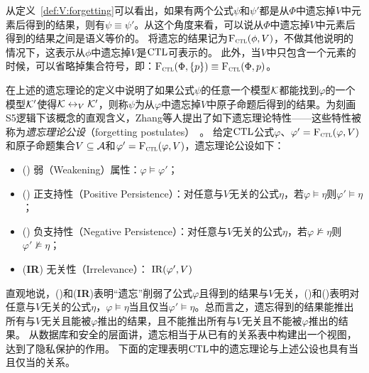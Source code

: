 	
从定义~\ref{def:V:forgetting}可以看出，如果有两个公式$\psi$和$\psi'$都是从$\Phi$中遗忘掉$V$中元素后得到的结果，则有$\psi\equiv \psi'$。从这个角度来看，可以说从$\Phi$中遗忘掉$V$中元素后得到的结果之间是语义等价的。
将遗忘的结果记为${\textsc{F}_{\textsc{ctl}}}(\phi,V)$，不做其他说明的情况下，这表示从$\phi$中遗忘掉$V$是$\textrm{CTL}$可表示的。
此外，当$V$中只包含一个元素的时候，可以省略掉集合符号，即：${\textsc{F}_{\textsc{ctl}}}(\Phi, \{p\}) \equiv {\textsc{F}_{\textsc{ctl}}}(\Phi, p)$。



在上述的遗忘理论的定义中说明了如果公式$\psi$的任意一个模型${\cal K}$都能找到$\varphi$的一个模型${\cal K}'$使得${\cal K} \leftrightarrow_V {\cal K}'$，则称$\psi$为从$\varphi$中遗忘掉$V$中原子命题后得到的结果。为刻画S5逻辑下该概念的直观含义，Zhang等人提出了如下遗忘理论特性——这些特性被称为\emph{遗忘理论公设}（forgetting postulates）~\cite{Yan:AIJ:2009}。
给定$\textrm{CTL}$公式$\varphi$、$\varphi'={\textsc{F}_{\textsc{ctl}}}(\varphi, V)$和原子命题集合$V\subseteq {\cal A}$和$\varphi'={\textsc{F}_{\textsc{ctl}}}(\varphi, V)$，遗忘理论公设如下：
\begin{itemize}
	\item[] (\W) 弱（Weakening）属性：$\varphi \models \varphi'$；
	\item[] (\PP) 正支持性（Positive Persistence）：对任意与$V$无关的公式$\eta$，若$\varphi \models \eta$则$\varphi' \models \eta$；
	\item[] (\NgP) 负支持性（Negative Persistence）：对任意与$V$无关的公式$\eta$，若$\varphi \not \models \eta$则$\varphi' \not \models \eta$；
	\item[] (\textbf{IR}) 无关性（Irrelevance）： $\textrm{IR}(\varphi', V)$
\end{itemize}
直观地说，(\W)和(\textbf{IR})表明“遗忘”削弱了公式$\varphi$且得到的结果与$V$无关，(\PP)和(\NgP)表明对任意与$V$无关的公式$\eta$，$\varphi \models \eta$当且仅当$\varphi' \models \eta$。总而言之，遗忘得到的结果能推出所有与$V$无关且能被$\varphi$推出的结果，且不能推出所有与$V$无关且不能被$\varphi$推出的结果。
从数据库和安全的层面讲，遗忘相当于从已有的关系表中构建出一个视图，达到了隐私保护的作用。
下面的定理表明$\textrm{CTL}$中的遗忘理论与上述公设也具有当且仅当的关系。

